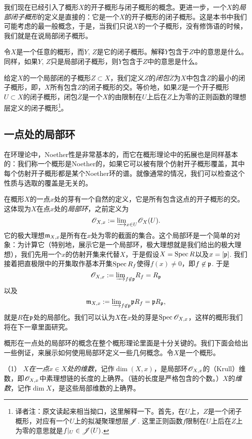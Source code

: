 我们现在已经引入了概形$X$的开子概形与闭子概形的概念。更进一步，一个$X$的\textit{局部闭子概形}的定义是直接的：它是一个$X$的开子概形的闭子概形。这是本书中我们可能考虑的最一般概念，于是，当我们只说$X$的一个子概形，没有修饰语的时候，我们就是在说局部闭子概形。

\begin{exe}
令$X$是一个任意的概形，而$Y$, $Z$是它的闭子概形。解释$Y$包含于$Z$中的意思是什么。同样，如果$Y$, $Z$只是局部闭子概形，则$Y$包含于$Z$中的意思是什么。
\end{exe}

给定$X$的一个局部闭的子概形$Z\subset X$，我们定义$Z$的\textit{闭包}$\overline{Z}$为$X$中包含$Z$的最小的闭子概形，即，$X$所有包含$Z$的闭子概形的交。等价地，如果$Z$是一个开子概形$U\subset X$的闭子概形，闭包$\overline{Z}$是一个$X$的由限制在$U$上后在$Z$上为零的正则函数的理想层定义的闭子概形\footnote{译者注：原文读起来相当拗口，这里解释一下。首先，在$U$上，$Z$是一个闭子概形，对应有一个$U$上的拟凝聚理想层$\mathscr{J}$. 这里正则函数$f$限制在$U$上后在$Z$上为零的意思就是$f|_U\in \mathscr{J}(U)$.}。

\subsection{一点处的局部环}

在环理论中，Noether性是非常基本的，而它在概形理论中的拓展也是同样基本的：我们称一个概形是Noether的，如果它可以被有限个仿射开子概形覆盖，其中每个仿射开子概形都是某个Noether环的谱。就像通常的情况，我们可以检查这个性质与选取的覆盖是无关的。

在概形$X$的一点$x$处的芽有一个自然的定义，它是所有包含这点的开子概形的交。这体现为$X$在点$x$处的\textit{局部环}，之前定义为
\[
	\mathscr{O}_{X,x}:={\varinjlim}_{x\in U}\mathscr{O}_X(U).
\]
它的极大理想$\mathfrak{m}_{X,x}$是所有在$x$处为零的截面的集合。这个局部环是一个简单的对象：为计算它（特别地，展示它是一个局部环，极大理想就是我们给出的极大理想），我们先用一个$x$的仿射开集来代替$X$，于是假设$X=\operatorname{Spec} R$以及$x=[\mathfrak{p}]$. 我们接着把直极限中的开集取作基本开集$\operatorname{Spec} R_f$使得$f(x)\neq 0$，即$f\not\in \mathfrak{p}$. 于是
\[
	\mathscr{O}_{X,x}:={\varinjlim}_{f\not\in \mathfrak{p}}R_f=R_{\mathfrak{p}}
\]
以及
\[
	\mathfrak{m}_{X,x}:={\varinjlim}_{f\not\in \mathfrak{p}}\mathfrak{p} R_f=\mathfrak{p} R_{\mathfrak{p}},
\]
就是$R$在$\mathfrak{p}$处的局部化。我们可以认为$X$在$x$处的芽是$\operatorname{Spec} \mathscr{O}_{X,x}$，这样的概形我们将在下一章里面研究。

概形在一点处的局部环的概念在整个概形理论里面是十分关键的。我们下面会给出一些例证，来展示如何使用局部环定义一些几何概念。令$X$是一个概形。

\vspace{0.5em}
（1） \textit{$X$在一点$x\in X$处的维数}，记作$\dim(X,x)$，是局部环$\mathscr{O}_{X,x}$的（Krull）维数，即$\mathscr{O}_{X,x}$中素理想链的长度的上确界。（链的长度是严格包含的个数。）$X$的\textit{维数}，记作$\dim X$，是这些局部维数的上确界。

